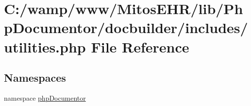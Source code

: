 \hypertarget{utilities_8php}{\section{\-C\-:/wamp/www/\-Mitos\-E\-H\-R/lib/\-Php\-Documentor/docbuilder/includes/utilities.php \-File \-Reference}
\label{utilities_8php}
}
\subsection*{\-Namespaces}
\begin{DoxyCompactItemize}
\item 
namespace \hyperlink{namespacephp_documentor}{php\-Documentor}
\end{DoxyCompactItemize}
